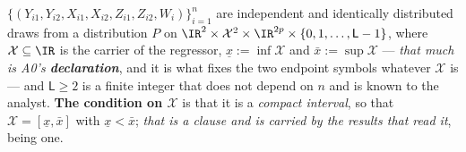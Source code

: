 
\begin{assumption}[A0: Sampling]\label{ass:sampling}
$\{(Y_{i1},Y_{i2},X_{i1},X_{i2},Z_{i1},Z_{i2},W_i)\}_{i=1}^{n}$ are independent and identically
distributed draws from a distribution $P$ on
$\IR^{2}\times\mathcal X^{2}\times\IR^{2p}\times\{0,1,\dots,\mathsf L-1\}$, where
$\mathcal X\subseteq\IR$ is the carrier of the regressor, $\underline x:=\inf\mathcal X$ and
$\bar x:=\sup\mathcal X$ --- \emph{that much is A0's \textbf{declaration}}, and it is what fixes the two
endpoint symbols whatever $\mathcal X$ is --- and $\mathsf L\ge2$ is a finite integer that does not depend
on $n$ and is known to the analyst. \textbf{The condition on $\mathcal X$} is that it is a
\emph{compact interval}, so that $\mathcal X=[\underline x,\bar x]$ with $\underline x<\bar x$;
\emph{that is a clause and is carried by the results that read it},  being one.
\end{assumption}


